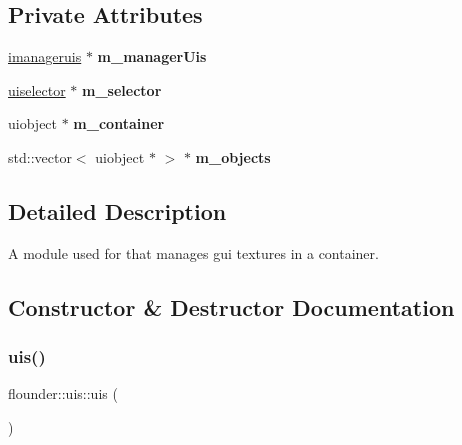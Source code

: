 \subsection*{Private Attributes}
\begin{DoxyCompactItemize}
\item 
\mbox{\label{classflounder_1_1uis_a18d404b6c0cfdb9f69ff41306d1c1443}} 
\hyperlink{classflounder_1_1imanageruis}{imanageruis} $\ast$ {\bfseries m\+\_\+manager\+Uis}
\item 
\mbox{\label{classflounder_1_1uis_a3ed999869d91c723a08105fe89a8312c}} 
\hyperlink{classflounder_1_1uiselector}{uiselector} $\ast$ {\bfseries m\+\_\+selector}
\item 
\mbox{\label{classflounder_1_1uis_af96c940b8c29b0f99471a2f71196e5fc}} 
uiobject $\ast$ {\bfseries m\+\_\+container}
\item 
\mbox{\label{classflounder_1_1uis_a1a939e9cf519161d12528cc84defdb9f}} 
std\+::vector$<$ uiobject $\ast$ $>$ $\ast$ {\bfseries m\+\_\+objects}
\end{DoxyCompactItemize}


\subsection{Detailed Description}
A module used for that manages gui textures in a container. 



\subsection{Constructor \& Destructor Documentation}
\mbox{\label{classflounder_1_1uis_a8deaea4a00735b3d102d0fb3fdad3098}} 
\subsubsection{\texorpdfstring{uis()}{uis()}}
{\footnotesize\ttfamily flounder\+::uis\+::uis (\begin{DoxyParamCaption}{ }\end{DoxyParamCaption})}



